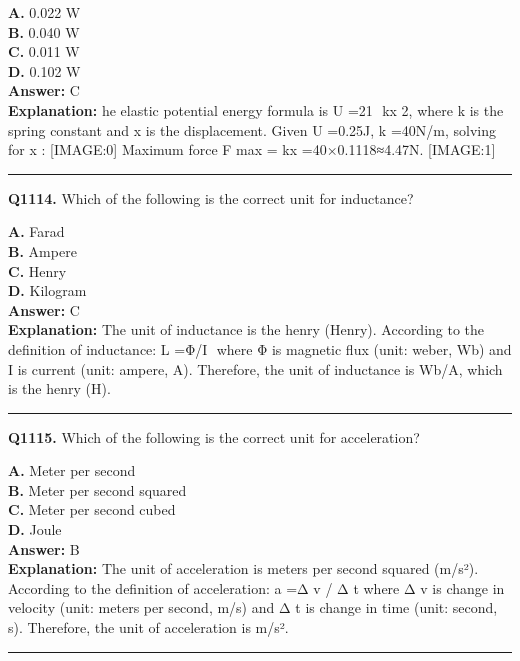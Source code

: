 \documentclass[12pt]{article}
\begin{document}
\textbf{A.} 0.022 W \\
\textbf{B.} 0.040 W \\
\textbf{C.} 0.011 W \\
\textbf{D.} 0.102 W \\

\textbf{Answer:} C \\
\textbf{Explanation:} he elastic potential energy formula is
U
=21
​
kx
2, where
k
is the spring constant and
x
is the displacement.
Given
U
=0.25J,
k
=40N/m, solving for
x
:
[IMAGE:0]
Maximum force
F
max
​
=
kx
=40×0.1118≈4.47N.
[IMAGE:1]

\hrule
\vspace{1em}


\noindent
\textbf{Q1114.} Which of the following is the correct unit for inductance?



\textbf{A.} Farad \\
\textbf{B.} Ampere \\
\textbf{C.} Henry \\
\textbf{D.} Kilogram \\

\textbf{Answer:} C \\
\textbf{Explanation:} The unit of inductance is the henry (Henry). According to the definition of inductance:
L
=Φ/I
​
where Φ is magnetic flux (unit: weber, Wb) and
I
is current (unit: ampere, A). Therefore, the unit of inductance is Wb/A, which is the henry (H).

\hrule
\vspace{1em}


\noindent
\textbf{Q1115.} Which of the following is the correct unit for acceleration?



\textbf{A.} Meter per second \\
\textbf{B.} Meter per second squared \\
\textbf{C.} Meter per second cubed \\
\textbf{D.} Joule \\

\textbf{Answer:} B \\
\textbf{Explanation:} The unit of acceleration is meters per second squared (m/s²). According to the definition of acceleration:
a
=Δ
v
​/
Δ
t
where Δ
v
is change in velocity (unit: meters per second, m/s) and Δ
t
is change in time (unit: second, s). Therefore, the unit of acceleration is m/s².

\hrule
\vspace{1em}
\end{document}
